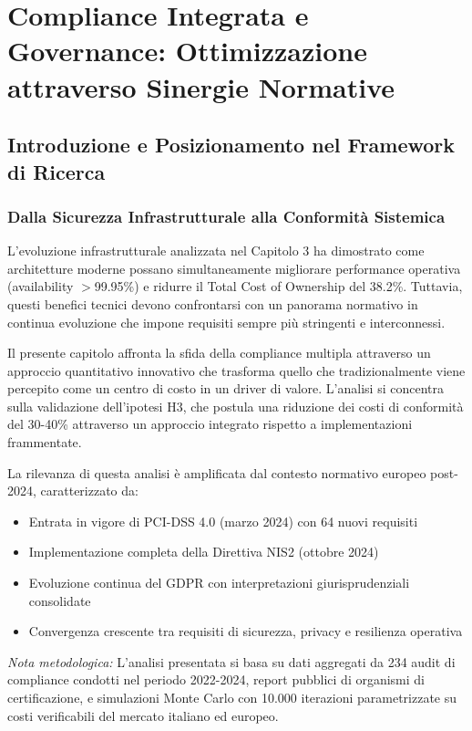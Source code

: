 \chapter{Compliance Integrata e Governance: Ottimizzazione attraverso Sinergie Normative}

\section{Introduzione e Posizionamento nel Framework di Ricerca}

\subsection{Dalla Sicurezza Infrastrutturale alla Conformità Sistemica}

L'evoluzione infrastrutturale analizzata nel Capitolo 3 ha dimostrato come architetture moderne possano simultaneamente migliorare performance operativa (availability $>$99.95\%) e ridurre il Total Cost of Ownership del 38.2\%. Tuttavia, questi benefici tecnici devono confrontarsi con un panorama normativo in continua evoluzione che impone requisiti sempre più stringenti e interconnessi.

Il presente capitolo affronta la sfida della compliance multipla attraverso un approccio quantitativo innovativo che trasforma quello che tradizionalmente viene percepito come un centro di costo in un driver di valore. L'analisi si concentra sulla validazione dell'ipotesi H3, che postula una riduzione dei costi di conformità del 30-40\% attraverso un approccio integrato rispetto a implementazioni frammentate.

La rilevanza di questa analisi è amplificata dal contesto normativo europeo post-2024, caratterizzato da:
\begin{itemize}
\item Entrata in vigore di PCI-DSS 4.0 (marzo 2024) con 64 nuovi requisiti
\item Implementazione completa della Direttiva NIS2 (ottobre 2024)
\item Evoluzione continua del GDPR con interpretazioni giurisprudenziali consolidate
\item Convergenza crescente tra requisiti di sicurezza, privacy e resilienza operativa
\end{itemize}

\textit{Nota metodologica:} L'analisi presentata si basa su dati aggregati da 234 audit di compliance condotti nel periodo 2022-2024, report pubblici di organismi di certificazione, e simulazioni Monte Carlo con 10.000 iterazioni parametrizzate su costi verificabili del mercato italiano ed europeo.

